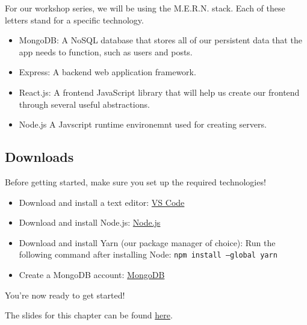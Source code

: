 For our workshop series, we will be using the M.E.R.N. stack. Each of these letters stand for a specific technology.
\begin{itemize}
    \item MongoDB: A NoSQL database that stores all of our persistent data that the app needs to function, such as users and posts. 
    \item Express: A backend web application framework. 
    \item React.js: A frontend JavaScript library that will help us create our frontend through several useful abstractions. 
    \item Node.js A Javscript runtime environemnt used for creating servers.
\end{itemize}

\subsection*{Downloads}

Before getting started, make sure you set up the required technologies!

\begin{itemize}
    \item Download and install a text editor: \href{https://code.visualstudio.com/download}{VS Code}
    \item Download and install Node.js: \href{https://nodejs.org/en/download/package-manager/}{Node.js}
    \item Download and install Yarn (our package manager of choice): Run the following command after installing Node: \texttt{npm install --global yarn}
    \item Create a MongoDB account: \href{https://www.mongodb.com/}{MongoDB}
\end{itemize}

You're now ready to get started!

\begin{kaobox}[title=Slides]
    The slides for this chapter can be found \href{https://docs.google.com/presentation/d/1Zn3jyHO7QTVQJxeyUJMpiafJbD4l0vokdyLDU3cUIlA/edit?usp=share_link}{here}. 
\end{kaobox}

